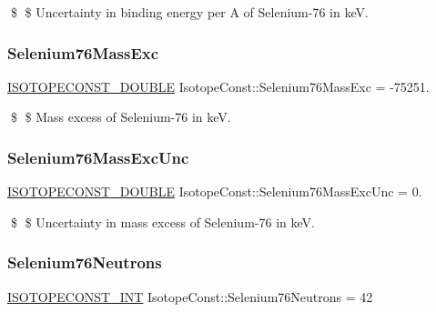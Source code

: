 \$ \$ Uncertainty in binding energy per A of Selenium-\/76 in keV. \mbox{\label{group___isotope_const-_selenium-_se76_gaebebfb9a5abe590e501985c7eec6c6db}} 
\subsubsection{\texorpdfstring{Selenium76\+Mass\+Exc}{Selenium76MassExc}}
{\footnotesize\ttfamily \mbox{\hyperlink{group___isotope_const-_macros_ga8f45a7272ce02c0b4c65c44636ed719a}{I\+S\+O\+T\+O\+P\+E\+C\+O\+N\+S\+T\+\_\+\+D\+O\+U\+B\+LE}} Isotope\+Const\+::\+Selenium76\+Mass\+Exc = -\/75251.}

\$ \$ Mass excess of Selenium-\/76 in keV. \mbox{\label{group___isotope_const-_selenium-_se76_ga1f89ab43e9db13a6f0c22106150ac3b1}} 
\subsubsection{\texorpdfstring{Selenium76\+Mass\+Exc\+Unc}{Selenium76MassExcUnc}}
{\footnotesize\ttfamily \mbox{\hyperlink{group___isotope_const-_macros_ga8f45a7272ce02c0b4c65c44636ed719a}{I\+S\+O\+T\+O\+P\+E\+C\+O\+N\+S\+T\+\_\+\+D\+O\+U\+B\+LE}} Isotope\+Const\+::\+Selenium76\+Mass\+Exc\+Unc = 0.}

\$ \$ Uncertainty in mass excess of Selenium-\/76 in keV. \mbox{\label{group___isotope_const-_selenium-_se76_ga34249371603f809762e6686efb169bee}} 
\subsubsection{\texorpdfstring{Selenium76\+Neutrons}{Selenium76Neutrons}}
{\footnotesize\ttfamily \mbox{\hyperlink{group___isotope_const-_macros_ga5f18360b3e99483a35c32d789e62621c}{I\+S\+O\+T\+O\+P\+E\+C\+O\+N\+S\+T\+\_\+\+I\+NT}} Isotope\+Const\+::\+Selenium76\+Neutrons = 42}

